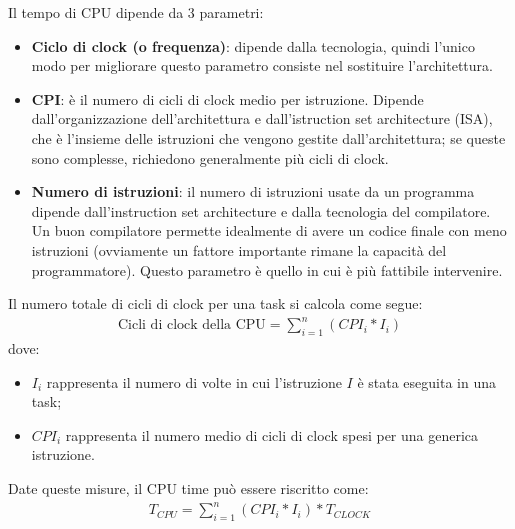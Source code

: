 Il tempo di CPU dipende da 3 parametri:
\begin{itemize}
    \item \textbf{Ciclo di clock (o frequenza)}: dipende dalla tecnologia, quindi l'unico modo per migliorare questo parametro consiste nel sostituire l'architettura.
    \item \textbf{CPI}: è il numero di cicli di clock medio per istruzione. Dipende dall'organizzazione dell'architettura e dall'istruction set architecture (ISA), che è l'insieme delle istruzioni che vengono gestite dall'architettura; se queste sono complesse, richiedono generalmente più cicli di clock.
    \item \textbf{Numero di istruzioni}: il numero di istruzioni usate da un programma dipende dall'instruction set architecture e dalla tecnologia del compilatore. Un buon compilatore permette idealmente di avere un codice finale con meno istruzioni (ovviamente un fattore importante rimane la capacità del programmatore). Questo parametro è quello in cui è più fattibile intervenire.
\end{itemize}

Il numero totale di cicli di clock per una task si calcola come segue:
\begin{align*}
    \text{Cicli di clock della CPU} = \sum^n_{i=1} (CPI_i * I_i)
\end{align*}
dove:
\begin{itemize}
    \item $I_i$ rappresenta il numero di volte in cui l'istruzione $I$ è stata eseguita in una task;
    \item $CPI_i$ rappresenta il numero medio di cicli di clock spesi per una generica istruzione.
\end{itemize}

Date queste misure, il CPU time può essere riscritto come:
\begin{align*}
    T_{CPU} = \sum^n_{i = 1} (CPI_i * I_i) * T_{CLOCK}
\end{align*}

